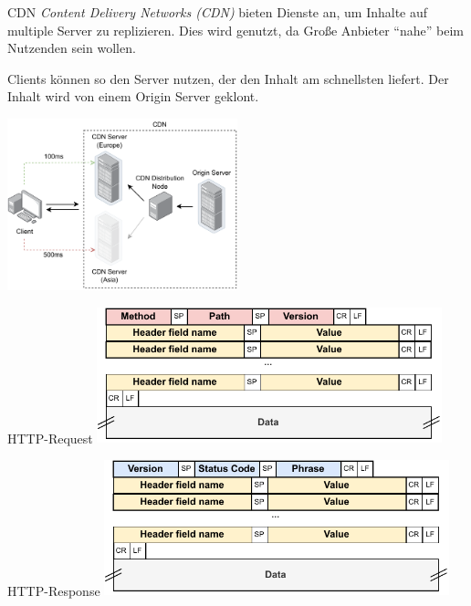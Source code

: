 \begin{defi}{CDN}
    \emph{Content Delivery Networks (CDN)} bieten Dienste an, um Inhalte auf multiple Server zu replizieren.
    Dies wird genutzt, da Große Anbieter \enquote{nahe} beim Nutzenden sein wollen.

    Clients können so den Server nutzen, der den Inhalt am schnellsten liefert.
    Der Inhalt wird von einem Origin Server geklont.

    \begin{center}
        \includegraphics[width=0.5\textwidth]{includes/figures/defi_cdn.pdf}
    \end{center}
\end{defi}

\begin{defi}{HTTP-Request}
    \centering
    \includegraphics[width=0.75\textwidth]{includes/figures/defi_http_request_header.pdf}
\end{defi}

\begin{defi}{HTTP-Response}
    \centering
    \includegraphics[width=0.75\textwidth]{includes/figures/defi_http_response_header.pdf}
\end{defi}

